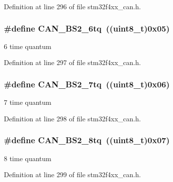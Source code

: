 Definition at line 296 of file stm32f4xx\-\_\-can.\-h.

\hypertarget{group___c_a_n__time__quantum__in__bit__segment__2_ga72c3245b794d3238763d1ec319bf386f}{
\subsubsection[{C\-A\-N\-\_\-\-B\-S2\-\_\-6tq}]{\setlength{\rightskip}{0pt plus 5cm}\#define C\-A\-N\-\_\-\-B\-S2\-\_\-6tq~((uint8\-\_\-t)0x05)}}\label{group___c_a_n__time__quantum__in__bit__segment__2_ga72c3245b794d3238763d1ec319bf386f}
6 time quantum 

Definition at line 297 of file stm32f4xx\-\_\-can.\-h.

\hypertarget{group___c_a_n__time__quantum__in__bit__segment__2_ga8005adaef02fb90e400909de08dec031}{
\subsubsection[{C\-A\-N\-\_\-\-B\-S2\-\_\-7tq}]{\setlength{\rightskip}{0pt plus 5cm}\#define C\-A\-N\-\_\-\-B\-S2\-\_\-7tq~((uint8\-\_\-t)0x06)}}\label{group___c_a_n__time__quantum__in__bit__segment__2_ga8005adaef02fb90e400909de08dec031}
7 time quantum 

Definition at line 298 of file stm32f4xx\-\_\-can.\-h.

\hypertarget{group___c_a_n__time__quantum__in__bit__segment__2_gaad8dcbb266cf5074bfb67bd7108597c6}{
\subsubsection[{C\-A\-N\-\_\-\-B\-S2\-\_\-8tq}]{\setlength{\rightskip}{0pt plus 5cm}\#define C\-A\-N\-\_\-\-B\-S2\-\_\-8tq~((uint8\-\_\-t)0x07)}}\label{group___c_a_n__time__quantum__in__bit__segment__2_gaad8dcbb266cf5074bfb67bd7108597c6}
8 time quantum 

Definition at line 299 of file stm32f4xx\-\_\-can.\-h.

